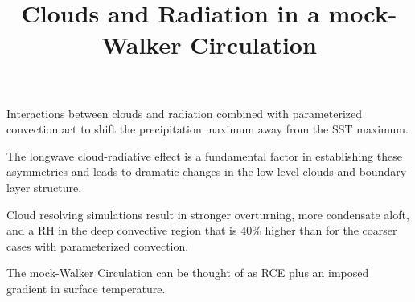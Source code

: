 \documentclass[draft]{agujournal2019}
\begin{document}
\title{Clouds and Radiation in a mock-Walker Circulation}


\begin{keypoints}
  \item{Interactions between clouds and radiation combined with parameterized convection act to shift the precipitation 
  maximum away from the SST maximum.}
  \item{The longwave cloud-radiative effect is a fundamental factor in establishing these asymmetries and leads to dramatic
  changes in the low-level clouds and boundary layer structure.}
  \item{Cloud resolving simulations result in stronger overturning, more condensate aloft, and a RH in the deep convective 
  region that is 40\% higher than for the coarser cases with parameterized convection.}
  \item{The mock-Walker Circulation can be thought of as RCE plus an imposed gradient in surface temperature.}
\end{keypoints}
\end{document}
